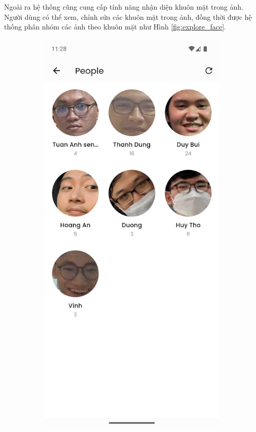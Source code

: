 Ngoài ra hệ thống cũng cung cấp tính năng nhận diện khuôn mặt trong ảnh. Người dùng có thể xem, chỉnh sửa các khuôn mặt trong ảnh, đồng thời được hệ thống phân nhóm các ảnh theo khuôn mặt như Hình \ref{fig:explore_face}.

\begin{figure}[H]
    \centering
    \begin{subfigure}{0.32\textwidth}
        \includegraphics[width=1\linewidth]{figures/c4/4-2/face_1.png} 

\end{subfigure}
\end{figure}

